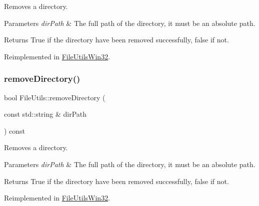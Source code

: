 Removes a directory.


\begin{DoxyParams}{Parameters}
{\em dir\+Path} & The full path of the directory, it must be an absolute path. \\
\hline
\end{DoxyParams}
\begin{DoxyReturn}{Returns}
True if the directory have been removed successfully, false if not. 
\end{DoxyReturn}


Reimplemented in \hyperlink{classFileUtilsWin32_a50a9cd9c6a65e4a3c33d188ac78b8a74}{File\+Utils\+Win32}.

\mbox{\label{classFileUtils_a0ced661e913489e0a86ef0273c0fb90f}} 
\subsubsection{\texorpdfstring{remove\+Directory()}{removeDirectory()}\hspace{0.1cm}{\footnotesize\ttfamily [2/3]}}
{\footnotesize\ttfamily bool File\+Utils\+::remove\+Directory (\begin{DoxyParamCaption}\item[{const std\+::string \&}]{dir\+Path }\end{DoxyParamCaption}) const\hspace{0.3cm}{\ttfamily [virtual]}}

Removes a directory.


\begin{DoxyParams}{Parameters}
{\em dir\+Path} & The full path of the directory, it must be an absolute path. \\
\hline
\end{DoxyParams}
\begin{DoxyReturn}{Returns}
True if the directory have been removed successfully, false if not. 
\end{DoxyReturn}


Reimplemented in \hyperlink{classFileUtilsWin32_ab190878679d22943a4b167fee6d200ee}{File\+Utils\+Win32}.

\mbox{\label{classFileUtils_aa7f1736afe9208df38fd88f2da3a8524}} 
